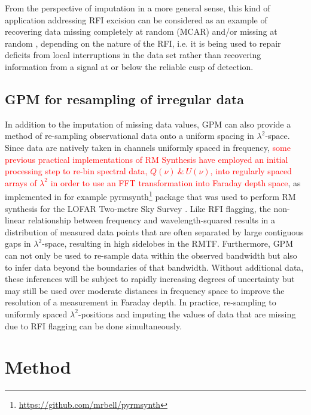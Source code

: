 \documentclass[fleqn,usenatbib]{mnras}
\begin{document}
From the perspective of imputation in a more general sense, this kind of application addressing RFI excision can be considered as an example of recovering data missing completely at random (MCAR) and/or missing at random \citep[MAR; e.g.][]{MAR}, depending on the nature of the RFI, i.e. it is being used to repair deficits from local interruptions in the data set rather than recovering information from a signal at or below the reliable cusp of detection.

\subsection{GPM for resampling of irregular data}
\label{sec:resampling}

In addition to the imputation of missing data values, GPM can also provide a method of re-sampling observational data onto a uniform spacing in $\lambda^2$-space. Since data are natively taken in channels uniformly spaced in frequency, \textcolor{red}{some previous practical implementations of RM Synthesis have employed an initial processing step to re-bin spectral data, $Q(\nu)~\&~U(\nu)$, into regularly spaced arrays of $\lambda^2$ in order to use an FFT transformation into Faraday depth space}, as implemented in for example {\sc pyrmsynth}\footnote{\url{https://github.com/mrbell/pyrmsynth}} package \citep[described in][]{pratley2020a} that was used to perform RM synthesis for the LOFAR Two-metre Sky Survey \citep{lofarpyrmsynth}. Like RFI flagging, the non-linear relationship between frequency and wavelength-squared results in a distribution of measured data points that are often separated by large contiguous gaps in $\lambda^2$-space, resulting in high sidelobes in the RMTF. Furthermore, GPM can not only be used to re-sample data within the observed bandwidth but also to infer data beyond the boundaries of that bandwidth. Without additional data, these inferences will be subject to rapidly increasing degrees of uncertainty but may still be used over moderate distances in frequency space to improve the resolution of a measurement in Faraday depth. In practice, re-sampling to uniformly spaced $\lambda^2$-positions and imputing the values of data that are missing due to RFI flagging can be done simultaneously.


\section{Method}
\label{sec:method}
\end{document}
